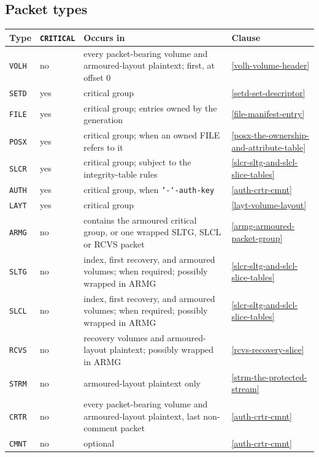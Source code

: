 \documentclass[10pt,a4paper]{report}
\newcommand{\option}[1]{\texttt{\char`-\char`-#1}}
\begin{document}
\subsection{Packet types}\label{packet-types}
\begin{longtable}{@{}L{.11\linewidth}L{.11\linewidth}L{.38\linewidth}L{.32\linewidth}@{}}
\toprule
Type & \verb|CRITICAL| & Occurs in & Clause \\
\midrule
\endhead
\bottomrule
\endlastfoot
\verb|VOLH| & no & every packet-bearing volume and armoured-layout plaintext;
first, at offset 0 &
\ref{volh-volume-header} \\
\verb|SETD| & yes & critical group & \ref{setd-set-descriptor} \\
\verb|FILE| & yes & critical group; entries owned by the generation &
\ref{file-manifest-entry} \\
\verb|POSX| & yes & critical group; when an owned FILE refers to it &
\ref{posx-the-ownership-and-attribute-table} \\
\verb|SLCR| & yes & critical group; subject to the integrity-table rules &
\ref{slcr-sltg-and-slcl-slice-tables} \\
\verb|AUTH| & yes & critical group, when \option{auth-key} &
\ref{auth-crtr-cmnt} \\
\verb|LAYT| & yes & critical group & \ref{layt-volume-layout} \\
\verb|ARMG| & no & contains the armoured critical group, or one wrapped
SLTG, SLCL or RCVS packet & \ref{armg-armoured-packet-group} \\
\verb|SLTG| & no & index, first recovery, and armoured volumes; when required;
possibly wrapped in ARMG & \ref{slcr-sltg-and-slcl-slice-tables} \\
\verb|SLCL| & no & index, first recovery, and armoured volumes; when required;
possibly wrapped in ARMG & \ref{slcr-sltg-and-slcl-slice-tables} \\
\verb|RCVS| & no & recovery volumes and armoured-layout plaintext; possibly
wrapped in ARMG & \ref{rcvs-recovery-slice} \\
\verb|STRM| & no & armoured-layout plaintext only &
\ref{strm-the-protected-stream} \\
\verb|CRTR| & no & every packet-bearing volume and armoured-layout plaintext,
last non-comment
packet & \ref{auth-crtr-cmnt} \\
\verb|CMNT| & no & optional & \ref{auth-crtr-cmnt} \\
\end{longtable}
\end{document}
